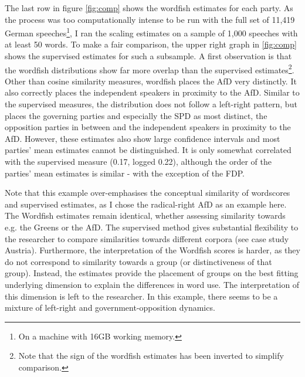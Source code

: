 \documentclass{article}
\begin{document}
The last row in figure \ref{fig:comp} shows the wordfish estimates for each party. As the process was too computationally intense to be run with the full set of 11,419 German speeches\footnote{On a machine with 16GB working memory.}, I ran the scaling estimates on a sample of 1,000 speeches with at least 50 words. To make a fair comparison, the upper right graph in \ref{fig:comp} shows the supervised estimates for such a subsample. A first observation is that the wordfish distributions show far more overlap than the supervised estimates\footnote{Note that the sign of the wordfish estimates has been inverted to simplify comparison.}. Other than cosine similarity measures, wordfish places the AfD very distinctly. It also correctly places the independent speakers in proximity to the AfD. Similar to the supervised measures, the distribution does not follow a left-right pattern, but places the governing parties and especially the SPD as most distinct, the opposition parties in between and the independent speakers in proximity to the AfD. However, these estimates also show large confidence intervals and most parties' mean estimates cannot be distinguished. It is only somewhat correlated with the supervised measure (0.17, logged 0.22), although the order of the parties' mean estimates is similar - with the exception of the FDP. \par


Note that this example over-emphasises the conceptual similarity of wordscores and supervised estimates, as I chose the radical-right AfD as an example here. The Wordfish estimates remain identical, whether assessing similarity towards e.g. the Greens or the AfD. The supervised method gives substantial flexibility to the researcher to compare similarities towards different corpora (see case study Austria). Furthermore, the interpretation of the Wordfish scores is harder, as they do not correspond to similarity towards a group (or distinctiveness of that group). Instead, the estimates provide the placement of groups on the best fitting underlying dimension to explain the differences in word use. The interpretation of this dimension is left to the researcher. In this example, there seems to be a mixture of left-right and government-opposition dynamics.\par
\end{document}
